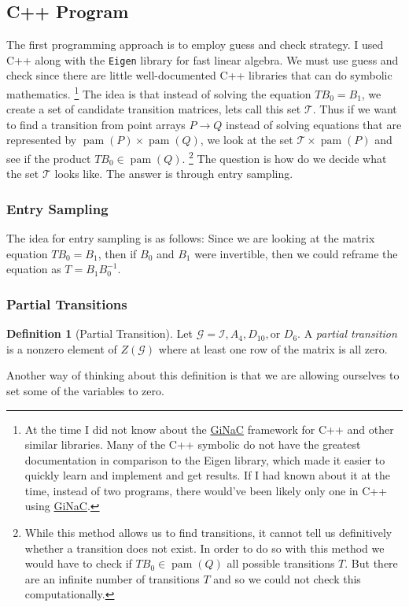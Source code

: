 \documentclass[a4paper,10pt]{article}
\let\oldfootnote\footnote
\renewcommand{\footnote}{\unskip\oldfootnote}
\theoremstyle{plain}
\theoremstyle{definition}
\newtheorem{Definition}[Theorem]{Definition}
\theoremstyle{remark}
\DeclareMathOperator{\pam}{pam}
\begin{document}
\subsection{C++ Program}
The first programming approach is to employ guess and check strategy.
I used C++ along with the \texttt{Eigen} library for fast linear algebra.
We must use guess and check since there are little well-documented C++ libraries that can do symbolic mathematics.
\footnote{
	At the time I did not know about the \href{https://www.ginac.de/}{GiNaC} framework for C++ and other similar libraries.
	Many of the C++ symbolic do not have the greatest documentation in comparison to the Eigen library, which made it easier to quickly learn and implement and get results.
	If I had known about it at the time, instead of two programs, there would've been likely only one in C++ using \href{https://www.ginac.de/}{GiNaC}.
}
The idea is that instead of solving the equation \( TB_0 = B_1 \), we create a set of candidate transition matrices, lets call this set \( \mathcal{T} \).
Thus if we want to find a transition from point arrays \( P \to Q \) instead of solving equations that are represented by \( \pam(P) \times \pam(Q) \), we look at the set \( \mathcal{T} \times \pam(P) \) and see if the product \( TB_0 \in \pam(Q) \).
\footnote{
	While this method allows us to find transitions, it cannot tell us definitively whether a transition does not exist.
	In order to do so with this method we would have to check if \( TB_0 \in \pam(Q) \) all possible transitions \( T \).
	But there are an infinite number of transitions \( T \) and so we could not check this computationally.
}
The question is how do we decide what the set \( \mathcal{T} \) looks like.
The answer is through entry sampling.

\subsubsection{Entry Sampling}
The idea for entry sampling is as follows:
Since we are looking at the matrix equation \( TB_0 = B_1 \), then if \( B_0 \) and \( B_1 \) were invertible, then we could reframe the equation as \( T = B_1B_0^{-1} \).

\subsubsection{Partial Transitions}
\begin{Definition}[Partial Transition]
	Let \(\mathcal{G} = \mathcal{I}, A_4, D_{10}, \text{or } D_6\).
	A \emph{partial transition} is a nonzero element of \(Z(\mathcal{G})\) where at least one row of the matrix is all zero.
\end{Definition}
Another way of thinking about this definition is that we are allowing ourselves to set some of the variables to zero.
\end{document}
